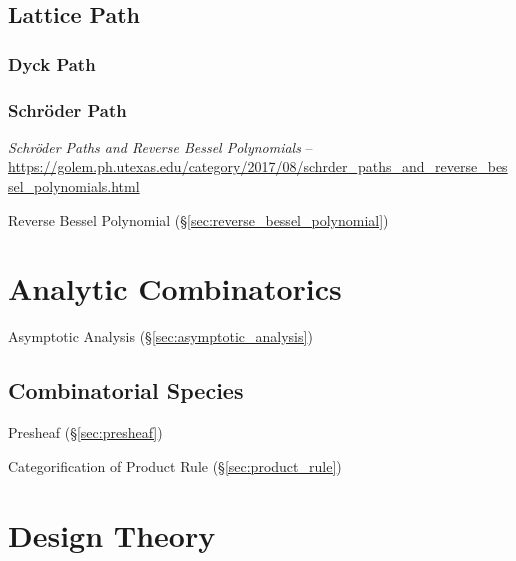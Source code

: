 \subsection{Lattice Path}\label{sec:lattice_path}

\subsubsection{Dyck Path}\label{sec:dyck_path}

\subsubsection{Schr\"oder Path}\label{sec:schroder_path}

\emph{Schr\"oder Paths and Reverse Bessel Polynomials} --
\url{https://golem.ph.utexas.edu/category/2017/08/schrder_paths_and_reverse_bessel_polynomials.html}

Reverse Bessel Polynomial (\S\ref{sec:reverse_bessel_polynomial})



\section{Analytic Combinatorics}\label{sec:analytic_combinatorics}
\cite{flajolet-sedgewick09}

Asymptotic Analysis (\S\ref{sec:asymptotic_analysis})



\subsection{Combinatorial Species}\label{sec:combinatorial_species}

Presheaf (\S\ref{sec:presheaf})

Categorification of Product Rule (\S\ref{sec:product_rule}) %



\section{Design Theory}\label{sec:combinatorial_design}

